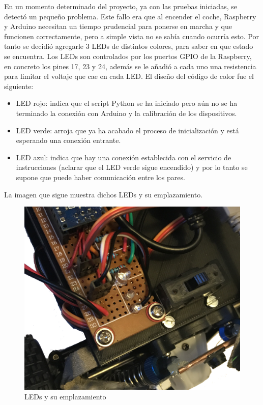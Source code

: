 \documentclass{pclass}
\begin{document}
\begin{itemize}
En un momento determinado del proyecto, ya con las pruebas iniciadas, se detectó un pequeño problema. Este fallo era que al encender el coche, Raspberry y Arduino necesitan un tiempo prudencial para ponerse en marcha y que funcionen correctamente, pero a simple vista no se sabía cuando ocurría esto. Por tanto se decidió agregarle 3 LEDs de distintos colores, para saber en que estado se encuentra. Los LEDs son controlados por los puertos GPIO de la Raspberry, en concreto los pines 17, 23 y 24, además se le añadió a cada uno una resistencia para limitar el voltaje que cae en cada LED. El diseño del código de color fue el siguiente:

\begin{itemize}
	\item LED rojo: indica que el script Python se ha iniciado pero aún no se ha terminado la conexión con Arduino y la calibración de los dispositivos.
	\item LED verde: arroja que ya ha acabado el proceso de inicialización y está esperando una conexión entrante.
	\item LED azul: indica que hay una conexión establecida con el servicio de instrucciones (aclarar que el LED verde sigue encendido) y por lo tanto se supone que puede haber comunicación entre los pares.
	
\end{itemize}

La imagen que sigue muestra dichos LEDs y su emplazamiento.

\begin{figure}[H]
	\centering
	\includegraphics[width=1\textwidth]{img/leds}
	\caption{LEDs y su emplazamiento}
	\label{fig:leds}
\end{figure}




\end{itemize}
\end{document}

